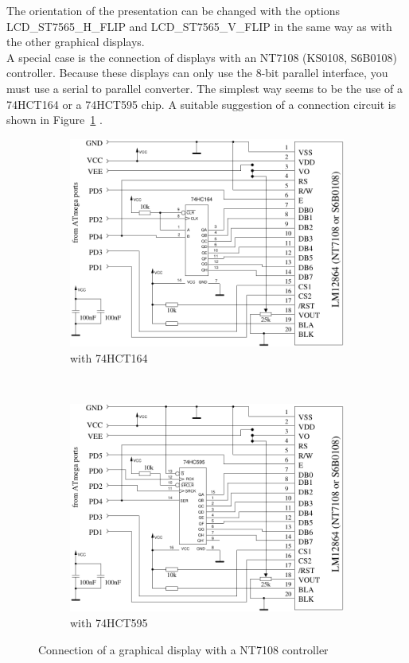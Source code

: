 The orientation of the presentation can be changed with the options LCD\_ST7565\_H\_FLIP and 
LCD\_ST7565\_V\_FLIP in the same way as with the other graphical displays.\\

A special case is the connection of displays with an NT7108 (KS0108, S6B0108) controller.
Because these displays can only use the 8-bit parallel interface,
you must use a serial to parallel converter.
The simplest way seems to be the use of a 74HCT164 or a 74HCT595 chip.
A suitable suggestion of a connection circuit is shown in Figure~\ref{fig:NT7108lcd} .

\begin{figure}[H]
  \begin{subfigure}[b]{.5\textwidth}
    \centering
    \includegraphics[width=.9\textwidth]{../FIG/ST7108serial164.pdf}
    \caption{with 74HCT164}
  \end{subfigure}
  ~
  \begin{subfigure}[b]{.5\textwidth}
    \centering
    \includegraphics[width=.9\textwidth]{../FIG/ST7108serial595.pdf}
    \caption{with 74HCT595}
  \end{subfigure}
  \caption{Connection of a graphical display with a NT7108 controller}
  \label{fig:NT7108lcd}
\end{figure}

